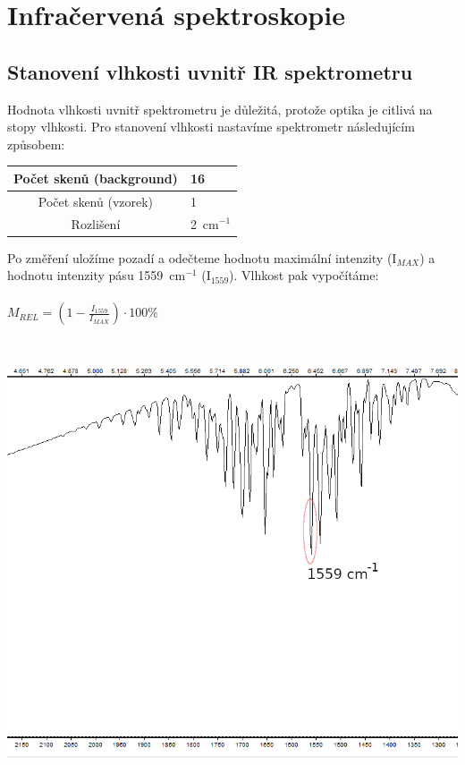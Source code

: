 \documentclass[12pt]{article}
\begin{document}
\section{Infračervená spektroskopie}

\subsection{Stanovení vlhkosti uvnitř IR spektrometru}
Hodnota vlhkosti uvnitř spektrometru je důležitá, protože optika je citlivá na stopy vlhkosti. Pro stanovení vlhkosti nastavíme spektrometr následujícím způsobem:

\begin{tabular}{|c|l|}
	\hline
	Počet skenů (background) & 16 \\\hline
	Počet skenů (vzorek) & 1 \\\hline
	Rozlišení & 2~cm$^{-1}$ \\\hline
\end{tabular}

Po změření uložíme pozadí a odečteme hodnotu maximální intenzity (I$_{MAX}$) a hodnotu intenzity pásu 1559~cm$^{-1}$ (I$_{1559}$). Vlhkost pak vypočítáme:
\\
\\
$M_{REL} = (1 - \frac{I_{1559}}{I_{MAX}}) \cdot 100 \%$

\begin{center}
	\includegraphics[keepaspectratio,height=13cm]{img/moisture.png}
\end{center}
\end{document}
